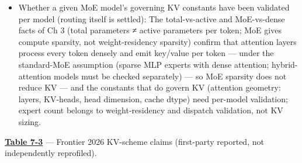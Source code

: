 \begin{itemize}
  and GLM report first-party KV-cache ratios, while Kimi and Qwen
  describe mechanisms with no stated KV metric (\hyperref[tab:7.3]{Table 7-3}). These are
  first-party figures, not independently reprofiled. Whether these
  constants reproduce on serving stacks, and what they imply for
  concurrency and fleet sizing, is unresolved. Size the host against the
  \emph{specific} model's KV scheme, not a universal constant.
\item
  Whether a given MoE model's governing KV constants have been validated
  per model (routing itself is settled): The total-vs-active and
  MoE-vs-dense facts of Ch 3 (total parameters ≠ active parameters per
  token; MoE gives compute sparsity, not weight-residency sparsity)
  confirm that attention layers process every token densely and emit
  key/value per token --- under the standard-MoE assumption (sparse MLP
  experts with dense attention; hybrid-attention models must be checked
  separately) --- so MoE sparsity does not reduce KV --- and the
  constants that do govern KV (attention geometry: layers, KV-heads,
  head dimension, cache dtype) need per-model validation; expert count
  belongs to weight-residency and dispatch validation, not KV sizing.
\end{itemize}

\textbf{\hyperref[tab:7.3]{Table 7-3}} --- Frontier 2026 KV-scheme claims (first-party
reported, not independently reprofiled).

